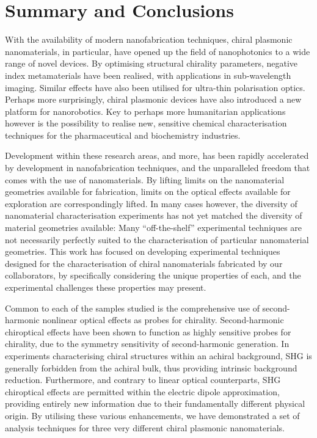 \chapter{Summary and Conclusions}\label{sec:Conclusions}

With the availability of modern nanofabrication techniques, chiral plasmonic nanomaterials, in particular, have opened up the field of nanophotonics to a wide range of novel devices. By optimising structural chirality parameters, negative index metamaterials have been realised, with applications in sub-wavelength imaging. Similar effects have also been utilised for ultra-thin polarisation optics. Perhaps more surprisingly, chiral plasmonic devices have also introduced a new platform for nanorobotics. Key to perhaps more humanitarian applications however is the possibility to realise new, sensitive chemical characterisation techniques for the pharmaceutical and biochemistry industries. 

Development within these research areas, and more, has been rapidly accelerated by development in nanofabrication techniques, and the unparalleled freedom that comes with the use of nanomaterials. By lifting limits on the nanomaterial geometries available for fabrication, limits on the optical effects available for exploration are correspondingly lifted. In many cases however, the diversity of nanomaterial characterisation experiments has not yet matched the diversity of material geometries available: Many ``off-the-shelf'' experimental techniques are not necessarily perfectly suited to the characterisation of particular nanomaterial geometries. This work has focused on developing experimental techniques designed for the characterisation of chiral nanomaterials fabricated by our collaborators, by specifically considering the unique properties of each, and the experimental challenges these properties may present. 

Common to each of the samples studied is the comprehensive use of second-harmonic nonlinear optical effects as probes for chirality. Second-harmonic chiroptical effects have been shown to function as highly sensitive probes for chirality, due to the symmetry sensitivity of second-harmonic generation. In experiments characterising chiral structures within an achiral background, SHG is generally forbidden from the achiral bulk, thus providing intrinsic background reduction. Furthermore, and contrary to linear optical counterparts, SHG chiroptical effects are permitted within the electric dipole approximation, providing entirely new information due to their fundamentally different physical origin. By utilising these various enhancements, we have demonstrated a set of analysis techniques for three very different chiral plasmonic nanomaterials.

